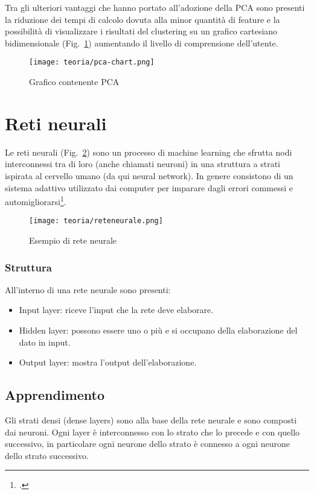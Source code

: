 Tra gli ulteriori vantaggi che hanno portato all'adozione della PCA sono presenti la riduzione dei tempi di calcolo dovuta alla minor quantità di feature e la possibilità di visualizzare i risultati del clustering su un grafico cartesiano bidimensionale (Fig.~\ref{fig:pca-chart}) aumentando il livello di comprensione dell'utente.

\begin{figure}[!h] 
    \centering 
    \texttt{[image: teoria/pca-chart.png]} 
    \caption{Grafico contenente PCA}
    \label{fig:pca-chart}
  \end{figure}

\section{Reti neurali}
Le reti neurali (Fig.~\ref{fig:rete-neurale}) sono un processo di machine learning che sfrutta nodi interconnessi tra di loro (anche chiamati neuroni) in una struttura a strati ispirata al cervello umano (da qui neural network).
In genere consistono di un sistema adattivo utilizzato dai computer per imparare dagli errori commessi e automigliorarsi\footcite{site:rete-neurale}.

\begin{figure}[!h] 
    \centering 
    \texttt{[image: teoria/reteneurale.png]} 
    \caption{Esempio di rete neurale}
    \label{fig:rete-neurale}
  \end{figure}

\subsubsection{Struttura}
All'interno di una rete neurale sono presenti:
\begin{itemize}
    \item Input layer: riceve l'input che la rete deve elaborare.
    \item Hidden layer: possono essere uno o più e si occupano della elaborazione del dato in input.
    \item Output layer: mostra l'output dell'elaborazione.
\end{itemize}

\subsection{Apprendimento}
Gli strati densi (dense layers) sono alla base della rete neurale e sono composti dai neuroni.
Ogni layer è interconnesso con lo strato che lo precede e con quello successivo, in particolare ogni neurone dello strato è connesso a ogni neurone dello strato successivo.


